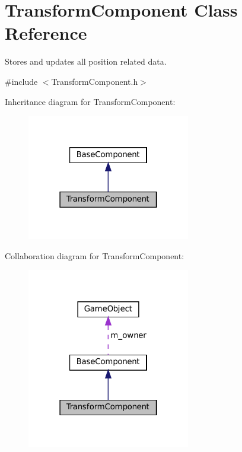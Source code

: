 \hypertarget{classTransformComponent}{}\section{Transform\+Component Class Reference}
\label{classTransformComponent}


Stores and updates all position related data.  




{\ttfamily \#include $<$Transform\+Component.\+h$>$}



Inheritance diagram for Transform\+Component\+:\nopagebreak
\begin{figure}[H]
\begin{center}
\leavevmode
\includegraphics[width=202pt]{classTransformComponent__inherit__graph}
\end{center}
\end{figure}


Collaboration diagram for Transform\+Component\+:\nopagebreak
\begin{figure}[H]
\begin{center}
\leavevmode
\includegraphics[width=202pt]{classTransformComponent__coll__graph}
\end{center}
\end{figure}
